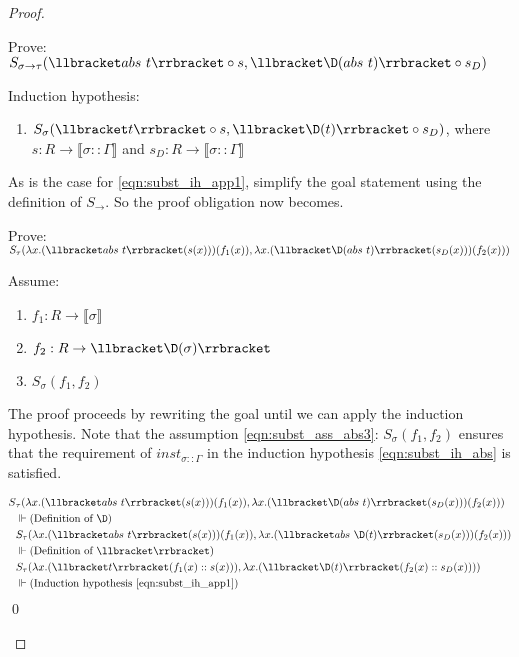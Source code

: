 \begin{proof}
\begin{enumerate}
        Prove: $S_{\sigma\rightarrow\tau}(\llbracket abs\ t \rrbracket \circ s, \llbracket \D(abs\ t) \rrbracket \circ s_D)$

        Induction hypothesis:
        \begin{enumerate}
          \item \label{eqn:subst_ih_abs} $S_\sigma(\llbracket t \rrbracket \circ s, \llbracket \D(t) \rrbracket \circ s_D)$, where $s : R \rightarrow \llbracket \sigma::\Gamma \rrbracket$ and $s_D : R \rightarrow \llbracket \sigma::\Gamma \rrbracket$
        \end{enumerate}

        As is the case for \ref{eqn:subst_ih_app1}, simplify the goal statement using the definition of $S_\rightarrow$. So the proof obligation now becomes.

        Prove: $S_{\tau}(\lambda x. (\llbracket abs\ t \rrbracket (s(x)))(f_1(x)), \lambda x. (\llbracket \D(abs\ t) \rrbracket (s_D(x)))(f_2(x)))$

        Assume:
        \begin{enumerate}
          \item $f_1 : R \rightarrow \llbracket \sigma \rrbracket$
          \item $f_2 : R \rightarrow \llbracket \D(\sigma) \rrbracket$
          \item \label{eqn:subst_ass_abs3} $S_\sigma(f_1, f_2)$
        \end{enumerate}

        The proof proceeds by rewriting the goal until we can apply the induction hypothesis.
        Note that the assumption \ref{eqn:subst_ass_abs3}: $S_\sigma(f_1, f_2)$ ensures that the requirement of $inst_{\sigma::\Gamma}$ in the induction hypothesis \ref{eqn:subst_ih_abs} is satisfied.

        \begin{align*}
          S&_{\tau}(\lambda x. (\llbracket abs\ t \rrbracket (s(x)))(f_1(x)), \lambda x. (\llbracket \D(abs\ t) \rrbracket (s_D(x)))(f_2(x))) \\
            &\Vdash \text{(Definition of $\D$)}\\
            & S_{\tau}(\lambda x. (\llbracket abs\ t \rrbracket (s(x)))(f_1(x)), \lambda x. (\llbracket abs\ \D(t) \rrbracket (s_D(x)))(f_2(x))) \\
            &\Vdash \text{(Definition of $\llbracket \rrbracket$)}\\
            & S_{\tau}(\lambda x. (\llbracket t \rrbracket (f_1(x) :: s(x))), \lambda x. (\llbracket \D(t) \rrbracket (f_2(x) :: s_D(x)))) \\
            &\Vdash \text{(Induction hypothesis \ref{eqn:subst_ih_app1})}
        \end{align*} \qed


\end{enumerate}
\end{proof}
